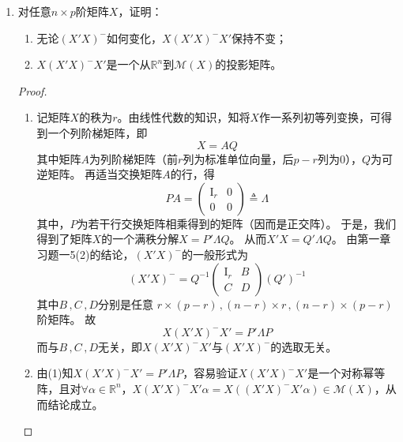 \documentclass[10pt]{article}
\theoremstyle{definition}
\theoremstyle{definition}
\begin{document}
\begin{enumerate}
    \item	%
        对任意$n\times p$阶矩阵$X$，证明：
        \begin{enumerate}[label=(\roman*)]
            \item 无论$(X'X)^-$如何变化，$X(X'X)^-X'$保持不变；\\
            \item$X(X'X)^-X'$是一个从$\mathbb{R}^n$到$\mathcal{M}(X)$的投影矩阵。
        \end{enumerate}

        \begin{proof}
            \begin{enumerate}[label=(\roman*)]
                \item
                    记矩阵$X$的秩为$r$。由线性代数的知识，知将$X$作一系列初等列变换，可得到一个列阶梯矩阵，即
                    \begin{equation*}
                        X=AQ
                    \end{equation*}
                    其中矩阵$A$为列阶梯矩阵（前$r$列为标准单位向量，后$p-r$列为0），$Q$为可逆矩阵。
                    再适当交换矩阵$A$的行，得
                    \begin{equation*}
                        PA=
                        \begin{pmatrix}
                            \mathrm{I}_r & 0 \\
                            0 & 0
                        \end{pmatrix}\triangleq \Lambda
                    \end{equation*}
                    其中，$P$为若干行交换矩阵相乘得到的矩阵（因而是正交阵）。
                    于是，我们得到了矩阵$X$的一个满秩分解$X=P'\Lambda Q$。
                    从而$X'X=Q'\Lambda Q$。
                    由第一章习题一5(2)的结论，$(X'X)^-$的一般形式为
                    \begin{equation*}
                        (X'X)^-=Q^{-1}
                        \begin{pmatrix}
                            \mathrm{I}_r & B \\
                            C & D
                        \end{pmatrix}(Q')^{-1}
                    \end{equation*}
                    其中$B\, ,C\, ,D$分别是任意
                    $r\times (p-r)\, ,(n-r)\times r\, ,(n-r)\times (p-r)$阶矩阵。
                    故
                    \begin{equation*}
                        X(X'X)^-X'=P'\Lambda P
                    \end{equation*}
                    而与$B\, ,C\, ,D$无关，即$X(X'X)^-X'$与$(X'X)^-$的选取无关。
                \item
                    由(1)知$X(X'X)^-X'=P'\Lambda P$，容易验证$X(X'X)^-X'$是一个对称幂等阵，且对$\forall \alpha \in \mathbb{R}^n$，$X(X'X)^-X'\alpha =X((X'X)^-X'\alpha)\in \mathcal{M}(X)$，从而结论成立。
            \end{enumerate}
        \end{proof}


\end{enumerate}
\end{document}
